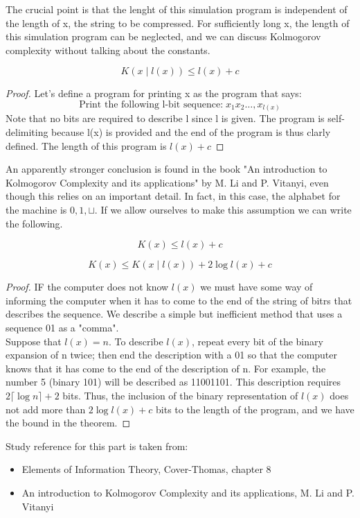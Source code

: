     The crucial point is that the lenght of this simulation program is independent of the length of x, the string to be compressed. For sufficiently long x, the length of this simulation program can be neglected, and we can discuss Kolmogorov complexity without talking about the constants.\\
    \begin{theorem}
        \[ 
            K(x\mid l(x))\leq l(x) +c 
        \]
        \begin{proof}
            Let's define a program for printing x as the program that says:
            \[ 
                \text{Print the following l-bit sequence:}\; x_{1}x_{2}\ldots,x_{l(x)}
            \]
            Note that no bits are required to describe l since l is given. The program is self-delimiting because l(x) is provided and the end of the program is thus clarly defined. The length of this program is $ l(x) +c $ 
        \end{proof}
    \end{theorem}
    An apparently stronger conclusion is found in the book "An introduction to Kolmogorov Complexity and its applications" by M. Li and P. Vitanyi, even though this relies on an important detail. In fact, in this case, the alphabet for the machine is ${0,1,\sqcup}$. If we allow ourselves to make this assumption we can write the following.
    \begin{theorem}
        \[ 
            K(x)\leq l(x) +c 
        \]
    \end{theorem}
        \[ 
            K(x)\leq K(x\mid l(x)) + 2\log{l(x)}+c 
        \]
        \begin{proof}
            IF the computer does not know $l(x)$ we must have some way of informing the computer when it has to come to the end of the string of bitrs that describes the sequence. We describe a simple but inefficient method that uses a sequence 01 as a "comma".\\
            Suppose that $l(x) = n$. To describe $l(x)$, repeat every bit of the binary expansion of n twice; then end the description with a 01 so that the computer knows that it has come to the end of the description of n. For example, the number 5 (binary 101) will be described as 11001101. This description requires $ 2 \lceil \log{n} \rceil +2 $ bits. Thus, the inclusion of the binary representation of $l(x)$ does not add more than $2\log{l(x)}+c$ bits to the length of the program, and we have the bound in the theorem.
        \end{proof}
    \begin{theorem}
        
    \end{theorem}
    Study reference for this part is taken from: 
    \begin{itemize}
        \item Elements of Information Theory, Cover-Thomas, chapter 8
        \item An introduction to Kolmogorov Complexity and its applications, M. Li and P. Vitanyi
    \end{itemize}
